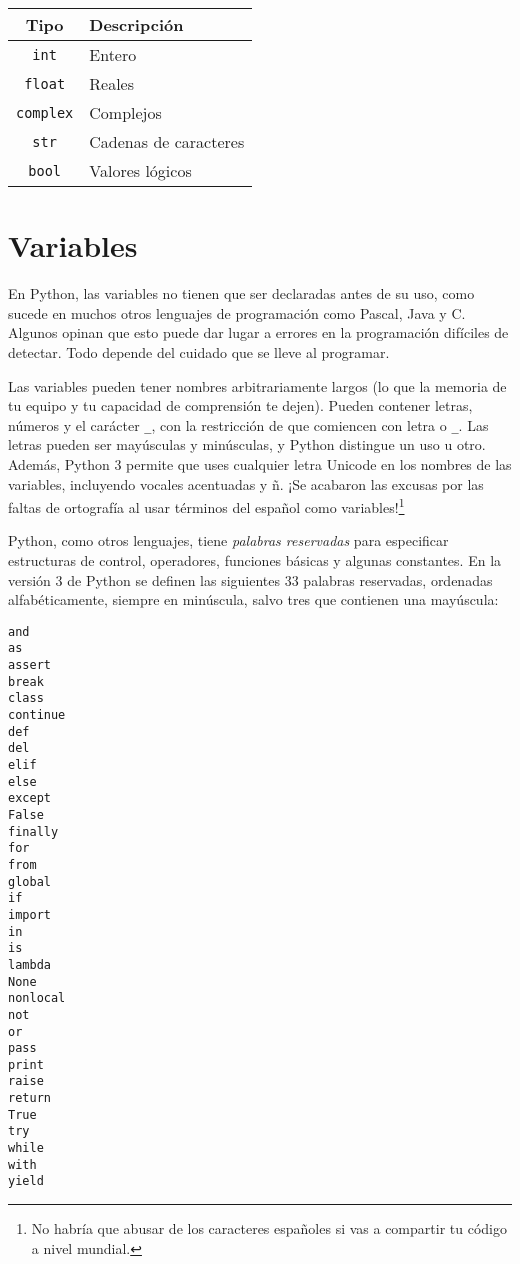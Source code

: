 \begin{tabular}{c|l}
	Tipo & Descripción\\
	\hline\hline
	\texttt{int} & Entero\\
	\texttt{float} & Reales\\
	\texttt{complex} & Complejos\\
	\texttt{str} & Cadenas de caracteres\\
	\texttt{bool} & Valores lógicos\\
	\hline
\end{tabular}

\section{Variables}

En Python, las variables no tienen que ser declaradas antes de su uso, como sucede en muchos otros lenguajes de programación como Pascal, Java y C. Algunos opinan que esto puede dar lugar a errores en la programación difíciles de detectar. Todo depende del cuidado que se lleve al programar.

Las variables pueden tener nombres arbitrariamente largos (lo que la memoria de tu equipo y tu capacidad de comprensión te dejen). Pueden contener letras, números y el carácter \texttt{\_}, con la restricción de que comiencen con letra o \texttt{\_}. Las letras pueden ser mayúsculas y minúsculas, y Python distingue un uso u otro. Además, Python 3 permite que uses cualquier letra Unicode en los nombres de las variables, incluyendo vocales acentuadas y ñ. ¡Se acabaron las excusas por las faltas de ortografía al usar términos del español como variables!\footnote{No habría que abusar de los caracteres españoles si vas a compartir tu código a nivel mundial.}

Python, como otros lenguajes, tiene \emph{palabras reservadas} para especificar estructuras de control, operadores, funciones básicas y algunas constantes. En la versión 3 de Python se definen las siguientes 33 palabras reservadas, ordenadas alfabéticamente, siempre en minúscula, salvo tres que contienen una mayúscula:

\begin{multicols}{5}
\begin{verbatim}
and
as
assert
break
class
continue
def
del
elif
else
except
False
finally
for
from
global
if
import
in
is
lambda
None
nonlocal
not
or
pass
print
raise
return
True
try
while
with
yield
\end{verbatim}
\end{multicols}

